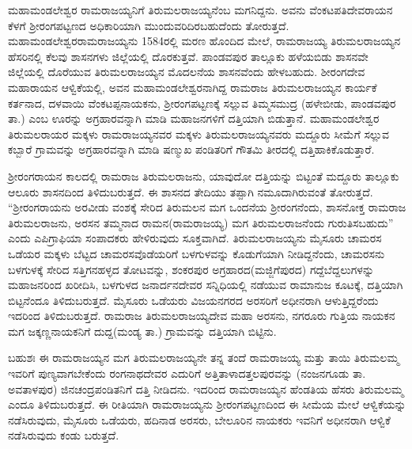 ಮಹಾಮಂಡಲೇಶ್ವರ ರಾಮರಾಜಯ್ಯನಿಗೆ ತಿರುಮಲರಾಜಯ್ಯನೆಂಬ ಮಗನಿದ್ದನು. ಅವನು ವೆಂಕಟಪತಿ\break ದೇವರಾಯನ ಕೆಳಗೆ ಶ‍್ರೀರಂಗಪಟ್ಟಣದ ಅಧಿಕಾರಿಯಾಗಿ ಮುಂದುವರಿದಿರಬಹುದೆಂದು ತೋರುತ್ತದೆ. ಮಹಾಮಂಡಲೇಶ್ವರ\break ರಾಮರಾಜಯ್ಯನು 1584ರಲ್ಲಿ ಮರಣ ಹೊಂದಿದ ಮೇಲೆ, ರಾಮರಾಜಯ್ಯ ತಿರುಮಲರಾಜಯ್ಯನ ಹೆಸರಿನಲ್ಲಿ ಕೆಲವು ಶಾಸನಗಳು ಜಿಲ್ಲೆಯಲ್ಲಿ ದೊರಕುತ್ತವೆ. ಪಾಂಡವಪುರ ತಾಲ್ಲೂಕು ಹಳೆಯಬಿಡು ಶಾಸನವೇ ಜಿಲ್ಲೆಯಲ್ಲಿ ದೊರೆಯುವ ತಿರುಮಲರಾಜಯ್ಯನ ಮೊದಲನೆಯ ಶಾಸನವೆಂದು ಹೇಳಬಹುದು. ಶೀರಂಗದೇವ ಮಹಾರಾಯನ ಆಳ್ವಿಕೆಯಲ್ಲಿ, ಅವನ ಮಹಾಮಂಡಲೇಶ್ವರನಾಗಿದ್ದ ರಾಮರಾಜ ತಿರುಮಲರಾಜಯ್ಯನ ಕಾರ್ಯಕೆ ಕರ್ತನಾದ, ದಳವಾಯಿ ವೆಂಕಟಪ್ಪನಾಯಕನು, ಶ‍್ರೀರಂಗಪಟ್ಟಣಕ್ಕೆ ಸಲ್ಲುವ ತಿಮ್ಮಸಮುದ್ರ (ಹಳೇಬೀಡು, ಪಾಂಡವಪುರ ತಾ.) ಎಂಬ ಊರನ್ನು ಅಗ್ರಹಾರವನ್ನಾಗಿ ಮಾಡಿ ಮಹಾಜನಗಳಿಗೆ ದತ್ತಿಯಾಗಿ ಬಿಡುತ್ತಾನೆ. ಮಹಾಮಂಡಲೇಶ್ವರ ತಿರುಮಲರಾಯರ ಮಕ್ಕಳು ರಾಮರಾಜಯ್ಯನವರ ಮಕ್ಕಳು ತಿರುಮಲರಾಜಯ್ಯನವರು ಮದ್ದೂರು ಸೀಮೆಗೆ ಸಲ್ಲುವ ಕಬ್ಬಾರೆ ಗ್ರಾಮವನ್ನು ಅಗ್ರಹಾರವನ್ನಾಗಿ ಮಾಡಿ ಷಣ್ಮುಖ ಪಂಡಿತರಿಗೆ ಗೌತಮಿ ತೀರದಲ್ಲಿ ದತ್ತಿಹಾಕಿ\-ಕೊಡುತ್ತಾರೆ.

ಶ‍್ರೀರಂಗರಾಯನ ಕಾಲದಲ್ಲಿ ರಾಮರಾಜ ತಿರುಮಲರಾಜನು, ಯಾವುದೋ ದತ್ತಿಯನ್ನು ಬಿಟ್ಟಂತೆ ಮದ್ದೂರು ತಾಲ್ಲೂಕು ಆಲೂರು ಶಾಸನದಿಂದ ತಿಳಿದುಬರುತ್ತದೆ. ಈ ಶಾಸನದ ತೇದಿಯು ತಪ್ಪಾಗಿ ನಮೂದಾಗಿರುವಂತೆ ತೋರುತ್ತದೆ. “ಶ‍್ರೀರಂಗರಾಯನು ಅರವೀಡು ವಂಶಕ್ಕೆ ಸೇರಿದ ತಿರುಮಲನ ಮಗ ಒಂದನೆಯ ಶ‍್ರೀರಂಗನೆಂದು, ಶಾಸನೋಕ್ತ ರಾಮರಾಜ ತಿರುಮಲರಾಜನು, ಅರಸನ ತಮ್ಮನಾದ ರಾಮನ(ರಾಮರಾಜಯ್ಯ) ಮಗ ತಿರುಮಲರಾಜನೆಂದು ಗುರುತಿಸಬಹುದು” ಎಂದು ಎಪಿಗ್ರಾಫಿಯಾ ಸಂಪಾದಕರು ಹೇಳಿರುವುದು ಸೂಕ್ತವಾಗಿದೆ. ತಿರುಮಲರಾಜಯ್ಯನು ಮೈಸೂರು ಚಾಮರಸ ಒಡೆಯರ ಮಕ್ಕಳು ಬೆಟ್ಟದ ಚಾಮರಸವೊಡೆಯರಿಗೆ ಬಳಗುಳವನ್ನು ಕೊಡುಗೆಯಾಗಿ ನೀಡಿದ್ದನೆಂದು, ಚಾಮರಸನು ಬಳಗುಳಕ್ಕೆ ಸೇರಿದ ಸತ್ತಿಗನಹಳ್ಳದ ತೋಟವನ್ನು, ಶಂಕರಪುರ ಅಗ್ರಹಾರದ(ಮಜ್ಜಿಗೆಪುರದ) ಗದ್ದೆಬೆದ್ದಲುಗಳನ್ನು ಮಹಾಜನರಿಂದ ಖರೀದಿಸಿ, ಬಳಗುಳದ ಜನಾರ್ದನದೇವರ ಸನ್ನಿಧಿಯಲ್ಲಿ ನಡೆಯುವ ರಾಮಾನುಜ ಕೂಟಕ್ಕೆ, ದತ್ತಿಯಾಗಿ ಬಿಟ್ಟನೆಂದೂ ತಿಳಿದುಬರುತ್ತದೆ. ಮೈಸೂರು ಒಡೆಯರು ವಿಜಯನಗರದ ಅರಸರಿಗೆ ಅಧೀನರಾಗಿ ಆಳುತ್ತಿದ್ದರೆಂದು ಇದರಿಂದ ತಿಳಿದುಬರುತ್ತದೆ. ರಾಮರಾಜ ತಿರುಮಲರಾಜಯ್ಯದೇವ ಮಹಾ ಅರಸನು, ನಗರೂರು ಗುತ್ತಿಯ ನಾಯಕನ ಮಗ ಜಕ್ಕಣ್ಣನಾಯಕನಿಗೆ ದುದ್ದ(ಮಂಡ್ಯ ತಾ.) ಗ್ರಾಮವನ್ನು ದತ್ತಿಯಾಗಿ ಬಿಟ್ಟಿನು.

ಬಹುಶಃ ಈ ರಾಮರಾಜಯ್ಯನ ಮಗ ತಿರುಮಲರಾಜಯ್ಯನೇ ತನ್ನ ತಂದೆ ರಾಮರಾಜಯ್ಯ ಮತ್ತು ತಾಯಿ ತಿರುಮಲಮ್ಮ ಇವರಿಗೆ ಪುಣ್ಯವಾಗಬೇಕೆಂದು ರಂಗನಾಥದೇವರ ಎದುರಿಗೆ ಅತ್ತಿತಾಳಾದತ್ತಲಪುರವನ್ನು (ನಂಜನಗೂಡು ತಾ. ಅವತಾಳಪುರ) ಜಿನಚಂದ್ರಪಂಡಿತನಿಗೆ ದತ್ತಿ ನೀಡಿದನು. ಇದರಿಂದ ರಾಮರಾಜಯ್ಯನ ಹೆಂಡತಿಯ ಹೆಸರು ತಿರುಮಲಮ್ಮ ಎಂದೂ ತಿಳಿದುಬರುತ್ತದೆ. ಈ ರೀತಿಯಾಗಿ ರಾಮರಾಜಯ್ಯನು ಶ‍್ರೀರಂಗಪಟ್ಟಣದಿಂದ ಈ ಸೀಮೆಯ ಮೇಲೆ ಆಳ್ವಿಕೆಯನ್ನು ನಡೆಸಿರುವುದು, ಮೈಸೂರು ಒಡೆಯರು, ಹದಿನಾಡ ಅರಸರು, ಬೇಲೂರಿನ ನಾಯಕರು ಇವನಿಗೆ ಅಧೀನರಾಗಿ ಆಳ್ವಿಕೆ ನಡೆಸಿರುವುದು ಕಂಡು ಬರುತ್ತದೆ.

